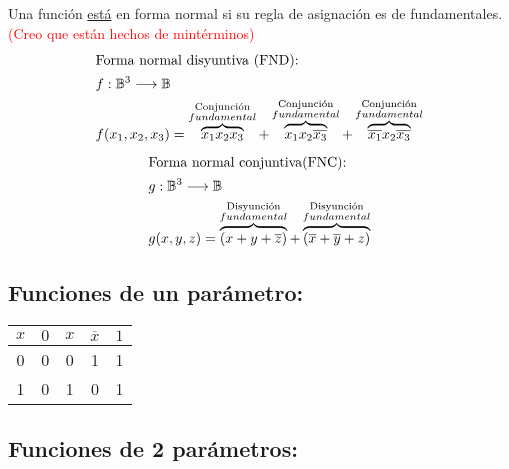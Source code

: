 \documentclass[../main.tex]{subfiles}
\begin{document}
Una función \underline{está} en forma normal  si su regla de asignación
es  de  fundamentales.
\textcolor{red}{(Creo que están hechos de mintérminos)}
\begin{align*}
	\intertext{Forma normal disyuntiva (FND):}
	&f:\mathbb{B}^3\longrightarrow\mathbb{B}\\
	&f(x_1,x_2,x_3)=\overbrace{x_1x_2x_3}^{\substack{\text{Conjunción}\\ fundamental}}
	+\overbrace{x_1x_2\overline{x_3}}^{\substack{\text{Conjunción}\\ fundamental}}
	+\overbrace{\overline{x_1}x_2\overline{x_3}}^{\substack{\text{Conjunción}\\ fundamental}}
\end{align*}
\begin{align*}
	\intertext{Forma normal conjuntiva(FNC):}
	&g:\mathbb{B}^3\longrightarrow\mathbb{B}\\
	&g(x,y,z)=\overbrace{(x+y+\overline{z})}^{\substack{\text{Disyunción}\\ fundamental}}
	+\overbrace{(\overline{x}+\overline{y}+z)}^{\substack{\text{Disyunción}\\ fundamental}}
\end{align*}
\subsection*{Funciones de un parámetro:}%
\begin{center}
	\begin{tabular}{*{4}{c|}c}
		$x$ & $0$ & $x$ & $\overline{x}$ & $1$\\
		\hline
		0 & 0 & 0 & 1 & 1\\
		1 & 0 & 1 & 0 & 1\\
	\end{tabular}
\end{center}
\subsection*{Funciones de 2 parámetros:}%
\end{document}
